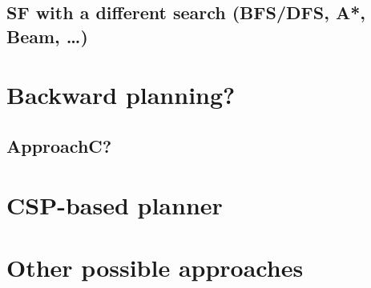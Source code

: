 \subsection{SF with a different search (BFS/DFS, A*, Beam, \ldots)}

\section{Backward planning?}

\subsection{ApproachC?}

\section{CSP-based planner}\label{csp-approach}


\section{Other possible approaches}


